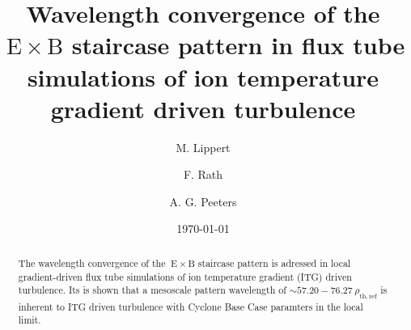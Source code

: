 \documentclass[aip, amsmath, amssymb, reprint, twocolumn]{revtex4-1}
\newcommand{\exb}{\mathrm{\:E \times B}}
\newcommand{\rhothref}{\rho_\mathrm{th,ref}}
\begin{document}

\title[Wavelength convergence of the ${\mathrm{\:E}\times\mathrm{B}}$ staircase pattern in flux tube simulations of ion temperature gradient driven turbulence]
{Wavelength convergence of the ${\mathrm{\:E}\times\mathrm{B}}$ staircase pattern in flux tube simulations of ion temperature gradient driven turbulence}

\author{M. Lippert}
\author{F. Rath}
\author{A. G. Peeters}

\date{\today}


\begin{abstract}
    The wavelength convergence of the $\exb$ staircase pattern is adressed in local gradient-driven flux tube simulations of ion temperature gradient (ITG) driven turbulence.
    Its is shown that a mesoscale pattern wavelength of $\sim 57.20 - 76.27~\rhothref$ is inherent to ITG driven turbulence with Cyclone Base Case paramters in the local limit. 
    
\end{abstract}

\maketitle



\end{document}
